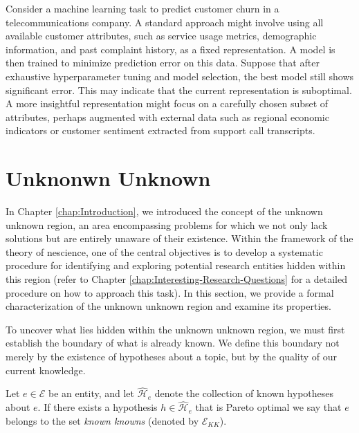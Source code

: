 \begin{example}
Consider a machine learning task to predict customer churn in a telecommunications company. A standard approach might involve using all available customer attributes, such as service usage metrics, demographic information, and past complaint history, as a fixed representation. A model is then trained to minimize prediction error on this data. Suppose that after exhaustive hyperparameter tuning and model selection, the best model still shows significant error. This may indicate that the current representation is suboptimal. A more insightful representation might focus on a carefully chosen subset of attributes, perhaps augmented with external data such as regional economic indicators or customer sentiment extracted from support call transcripts.
\end{example}

%
%

\section{Unknonwn Unknown}

In Chapter \ref{chap:Introduction}, we introduced the concept of the unknown unknown region, an area encompassing problems for which we not only lack solutions but are entirely unaware of their existence. Within the framework of the theory of nescience, one of the central objectives is to develop a systematic procedure for identifying and exploring potential research entities hidden within this region (refer to Chapter \ref{chap:Interesting-Research-Questions} for a detailed procedure on how to approach this task). In this section, we provide a formal characterization of the unknown unknown region and examine its properties.

To uncover what lies hidden within the unknown unknown region, we must first establish the boundary of what is already known. We define this boundary not merely by the existence of hypotheses about a topic, but by the quality of our current knowledge.

\begin{definition}
Let $e \in \mathcal{E}$ be an entity, and let $\hat{\mathcal{H}}_e$ denote the collection of known hypotheses about $e$. If there exists a hypothesis $h \in \hat{\mathcal{H}}_e$ that is Pareto optimal we say that $e$ belongs to the set \emph{known knowns} (denoted by $\mathcal{E}_{KK}$).
\end{definition}

